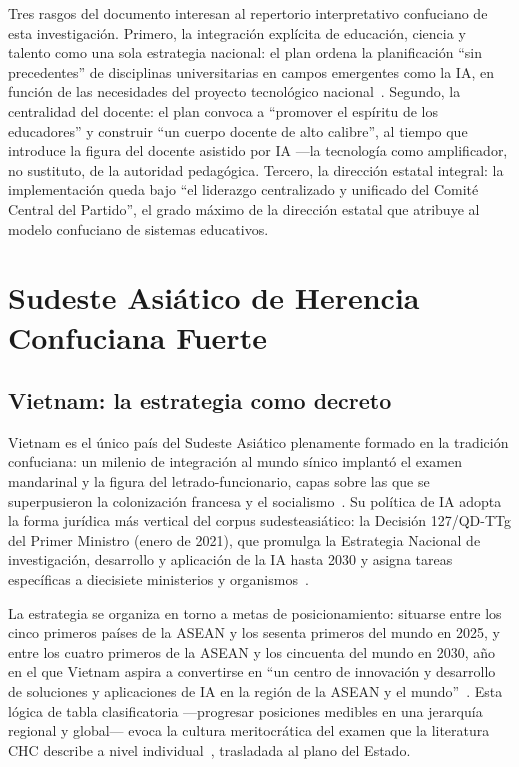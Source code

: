 Tres rasgos del documento interesan al repertorio interpretativo confuciano de esta investigación. Primero, la integración explícita de educación, ciencia y talento como una sola estrategia nacional: el plan ordena la planificación ``sin precedentes'' de disciplinas universitarias en campos emergentes como la IA, en función de las necesidades del proyecto tecnológico nacional~\citep{china2026fyp}. Segundo, la centralidad del docente: el plan convoca a ``promover el espíritu de los educadores'' y construir ``un cuerpo docente de alto calibre'', al tiempo que introduce la figura del docente asistido por IA —la tecnología como amplificador, no sustituto, de la autoridad pedagógica. Tercero, la dirección estatal integral: la implementación queda bajo ``el liderazgo centralizado y unificado del Comité Central del Partido'', el grado máximo de la dirección estatal que \citet{marginson2011higher} atribuye al modelo confuciano de sistemas educativos.


\section{Sudeste Asiático de Herencia Confuciana Fuerte}
\label{sec:sea-chc}

\subsection{Vietnam: la estrategia como decreto}
\label{subsec:vietnam}

Vietnam es el único país del Sudeste Asiático plenamente formado en la tradición confuciana: un milenio de integración al mundo sínico implantó el examen mandarinal y la figura del letrado-funcionario, capas sobre las que se superpusieron la colonización francesa y el socialismo~\citep{london2011education, nguyen2025confucian}. Su política de IA adopta la forma jurídica más vertical del corpus sudesteasiático: la Decisión 127/QD-TTg del Primer Ministro (enero de 2021), que promulga la Estrategia Nacional de investigación, desarrollo y aplicación de la IA hasta 2030 y asigna tareas específicas a diecisiete ministerios y organismos~\citep{vietnam2021ai}.

La estrategia se organiza en torno a metas de posicionamiento: situarse entre los cinco primeros países de la ASEAN y los sesenta primeros del mundo en 2025, y entre los cuatro primeros de la ASEAN y los cincuenta del mundo en 2030, año en el que Vietnam aspira a convertirse en ``un centro de innovación y desarrollo de soluciones y aplicaciones de IA en la región de la ASEAN y el mundo''~\citep{vietnam2021ai}. Esta lógica de tabla clasificatoria —progresar posiciones medibles en una jerarquía regional y global— evoca la cultura meritocrática del examen que la literatura CHC describe a nivel individual~\citep{suen2006chronic}, trasladada al plano del Estado.

